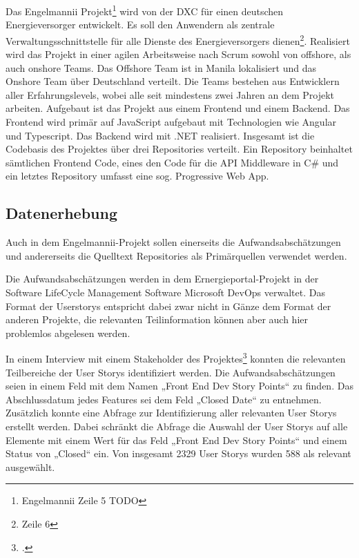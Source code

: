 Das Engelmannii Projekt\footnote{Engelmannii Zeile 5 TODO} wird von der
DXC für einen deutschen Energieversorger entwickelt. Es soll den
Anwendern als zentrale Verwaltungsschnittstelle für alle Dienste des
Energieversorgers dienen\footnote{Zeile 6}. Realisiert wird das Projekt
in einer agilen Arbeitsweise nach Scrum sowohl von offshore, als auch
onshore Teams. Das Offshore Team ist in Manila lokalisiert und das
Onshore Team über Deutschland verteilt. Die Teams bestehen aus
Entwicklern aller Erfahrungslevels, wobei alle seit mindestens zwei
Jahren an dem Projekt arbeiten. Aufgebaut ist das Projekt aus einem
Frontend und einem Backend. Das Frontend wird primär auf JavaScript
aufgebaut mit Technologien wie Angular und Typescript. Das Backend wird
mit .NET realisiert. Insgesamt ist die Codebasis des Projektes über drei
Repositories verteilt. Ein Repository beinhaltet sämtlichen Frontend
Code, eines den Code für die API Middleware in C\# und ein letztes
Repository umfasst eine sog. Progressive Web App.

\subsection{Datenerhebung}\label{engelmannii-Datenerhebung}

Auch in dem Engelmannii-Projekt sollen einerseits die
Aufwandsabschätzungen und andererseits die Quelltext Repositories als
Primärquellen verwendet werden.

Die Aufwandsabschätzungen werden in dem Ernergieportal-Projekt in der
Software LifeCycle Management Software Microsoft DevOps verwaltet. Das
Format der Userstorys entspricht dabei zwar nicht in Gänze dem Format
der anderen Projekte, die relevanten Teilinformation können aber auch
hier problemlos abgelesen werden.

In einem Interview mit einem Stakeholder des Projektes\footcite[Vgl. ][]{stakeholdernInterviewMitStakeholdern2022}
konnten die relevanten Teilbereiche der User Storys identifiziert
werden. Die Aufwandsabschätzungen seien in einem Feld mit dem Namen
„Front End Dev Story Points`` zu finden. Das Abschlussdatum jedes
Features sei dem Feld „Closed Date`` zu entnehmen. Zusätzlich konnte
eine Abfrage zur Identifizierung aller relevanten User Storys erstellt
werden. Dabei schränkt die Abfrage die Auswahl der User Storys auf alle
Elemente mit einem Wert für das Feld „Front End Dev Story Points`` und
einem Status von „Closed`` ein. Von insgesamt 2329 User Storys wurden
588 als relevant ausgewählt.

